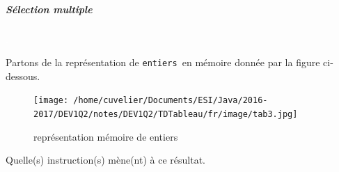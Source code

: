 \documentclass[11pt,a4paper]{article}
\begin{document}
			
		\subparagraph{S\'election multiple} 
		
                \textcolor{white}{.} \par
            
								Partons de la repr\'esentation de \verb|entiers |en m\'emoire
								donn\'ee par la figure ci-dessous.  
							\begin{figure}[hbt]
				    \begin{center}
					\texttt{[image: /home/cuvelier/Documents/ESI/Java/2016-2017/DEV1Q2/notes/DEV1Q2/TDTableau/fr/image/tab3.jpg]}
						\end{center}
                
                    \caption[repr\'esentation m\'emoire de entiers]{repr\'esentation m\'emoire de entiers}
                \end{figure}
                    
            \par
        
								Quelle(s) instruction(s) m\`ene(nt) \`a ce r\'esultat.   
							
            \par
        
\end{document}
